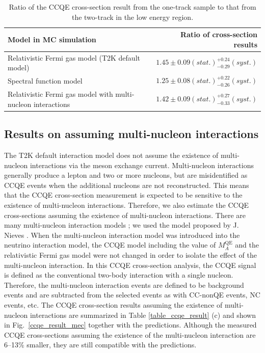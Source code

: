 \documentclass[%
 reprint,
superscriptaddress,
 amsmath,amssymb,
 aps,
]{revtex4-1}
\begin{document}
\begin{table}[htbp]
\begin{center}
\caption{Ratio of the CCQE cross-section result from the one-track sample to that from the two-track in the low energy region.}
\begin{tabular}{lr}
\hline \hline
Model in MC simulation & Ratio of cross-section results\\
\hline
Relativistic Fermi gas model (T2K default model)&$1.45\pm0.09(stat.)_{-0.29}^{+0.24}(syst.)$\\
Spectral function model&$1.25\pm0.08(stat.)_{-0.26}^{+0.22}(syst.)$\\
Relativistic Fermi gas model with multi-nucleon interactions&$1.42\pm0.09(stat.)_{-0.33}^{+0.27}(syst.)$\\ \hline \hline
\end{tabular}
\label{ccqe_1trk_2trk_ratio}
  \end{center}
\end{table}

\subsection{Results on assuming multi-nucleon interactions}\label{mec_result}
The T2K default interaction model does not assume the existence of  multi-nucleon interactions via the meson exchange current.
Multi-nucleon interactions generally produce a lepton and two or more nucleons, but are misidentified as CCQE events when the additional nucleons are not reconstructed.
This means that the CCQE cross-section measurement is expected to be sensitive to the existence of multi-nucleon interactions.
Therefore, we also estimate the CCQE cross-sections assuming the existence of multi-nucleon interactions.
There are many multi-nucleon interaction models \cite{mec_martini1, mec_martini2, mec_nieves1, mec_nieves2, mec_bodek, mec_lalakulich, mec_amaro}; we used the model proposed by J. Nieves \cite{mec_nieves1, mec_nieves2}.
When the multi-nucleon interaction model was introduced into the neutrino interaction model, the CCQE model including the value of $M_A^{\mathrm{QE}}$ and the relativistic Fermi gas model were not changed in order to isolate the effect of the multi-nucleon interaction.
In this CCQE cross-section analysis, the CCQE signal is defined as the conventional two-body interaction with a single nucleon.
Therefore, the multi-nucleon interaction events are defined to be background events and are subtracted from the selected events as with CC-nonQE events, NC events, etc.
The CCQE cross-section results assuming the existence of multi-nucleon interactions are summarized in Table \ref{table_ccqe_result} (c) and shown in Fig.~\ref{ccqe_result_mec} together with the predictions.
Although the measured CCQE cross-sections assuming the existence of the multi-nucleon interaction are 6--13\% smaller, they are still compatible with the predictions.
\end{document}
